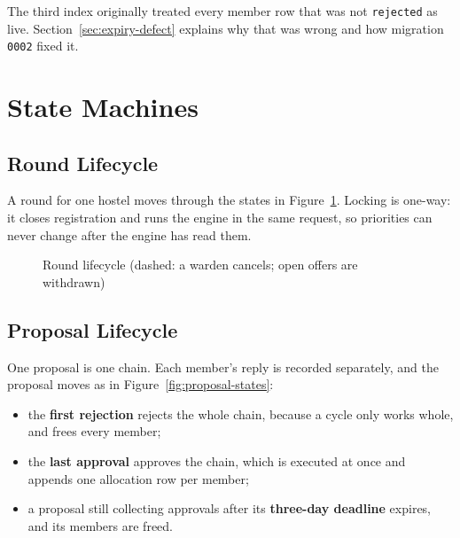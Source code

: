 The third index originally treated every member row that was not
\texttt{rejected} as live. Section~\ref{sec:expiry-defect} explains why
that was wrong and how migration \texttt{0002} fixed it.

\section{State Machines}

\subsection{Round Lifecycle}

A round for one hostel moves through the states in
Figure~\ref{fig:round-states}. Locking is one-way: it closes
registration and runs the engine in the same request, so priorities can
never change after the engine has read them.

\begin{figure}[H]
\centering
{}
\caption{Round lifecycle (dashed: a warden cancels; open offers are withdrawn)}
\label{fig:round-states}
\end{figure}

\subsection{Proposal Lifecycle}

One proposal is one chain. Each member's reply is recorded separately,
and the proposal moves as in Figure~\ref{fig:proposal-states}:

\begin{itemize}
  \item the \textbf{first rejection} rejects the whole chain, because a
  cycle only works whole, and frees every member;
  \item the \textbf{last approval} approves the chain, which is executed
  at once and appends one allocation row per member;
  \item a proposal still collecting approvals after its
  \textbf{three-day deadline} expires, and its members are freed.
\end{itemize}

